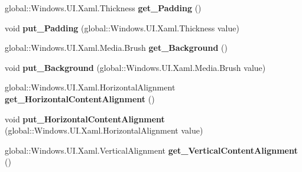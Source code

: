 \begin{DoxyCompactItemize}
global\+::\+Windows.\+U\+I.\+Xaml.\+Thickness {\bfseries get\+\_\+\+Padding} ()
\item 
\mbox{\label{interface_windows_1_1_u_i_1_1_xaml_1_1_controls_1_1_i_content_presenter4_af18a60ec485bc0df6feb66d44efadbb0}} 
void {\bfseries put\+\_\+\+Padding} (global\+::\+Windows.\+U\+I.\+Xaml.\+Thickness value)
\item 
\mbox{\label{interface_windows_1_1_u_i_1_1_xaml_1_1_controls_1_1_i_content_presenter4_a89f236cfa72e4352ba5ff825a2ec9f5a}} 
global\+::\+Windows.\+U\+I.\+Xaml.\+Media.\+Brush {\bfseries get\+\_\+\+Background} ()
\item 
\mbox{\label{interface_windows_1_1_u_i_1_1_xaml_1_1_controls_1_1_i_content_presenter4_a052301695cb479ae10c998256c35d352}} 
void {\bfseries put\+\_\+\+Background} (global\+::\+Windows.\+U\+I.\+Xaml.\+Media.\+Brush value)
\item 
\mbox{\label{interface_windows_1_1_u_i_1_1_xaml_1_1_controls_1_1_i_content_presenter4_a09a08983436a09edb0fcc2b73c746b45}} 
global\+::\+Windows.\+U\+I.\+Xaml.\+Horizontal\+Alignment {\bfseries get\+\_\+\+Horizontal\+Content\+Alignment} ()
\item 
\mbox{\label{interface_windows_1_1_u_i_1_1_xaml_1_1_controls_1_1_i_content_presenter4_ae336a6680b3867b8c159d802caafbe13}} 
void {\bfseries put\+\_\+\+Horizontal\+Content\+Alignment} (global\+::\+Windows.\+U\+I.\+Xaml.\+Horizontal\+Alignment value)
\item 
\mbox{\label{interface_windows_1_1_u_i_1_1_xaml_1_1_controls_1_1_i_content_presenter4_acb36f5224b57a6975ff61aeee1ab5f74}} 
global\+::\+Windows.\+U\+I.\+Xaml.\+Vertical\+Alignment {\bfseries get\+\_\+\+Vertical\+Content\+Alignment} ()
\item 
\mbox{\label{interface_windows_1_1_u_i_1_1_xaml_1_1_controls_1_1_i_content_presenter4_adb058d58f1fe8cb9afcc0b94b026986c}} 

\end{DoxyCompactItemize}
